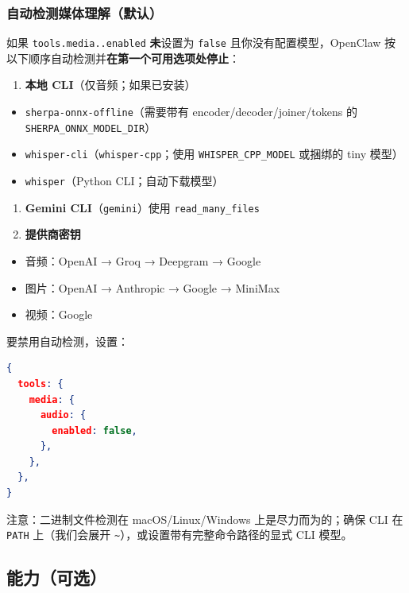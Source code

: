 \subsubsection{自动检测媒体理解（默认）}


如果 \texttt{tools.media..enabled} \textbf{未}设置为 \texttt{false} 且你没有配置模型，OpenClaw 按以下顺序自动检测并\textbf{在第一个可用选项处停止}：

\begin{enumerate}
  \item \textbf{本地 CLI}（仅音频；如果已安装）
\end{enumerate}

\begin{itemize}
  \item \texttt{sherpa-onnx-offline}（需要带有 encoder/decoder/joiner/tokens 的 \texttt{SHERPA\_ONNX\_MODEL\_DIR}）
  \item \texttt{whisper-cli}（\texttt{whisper-cpp}；使用 \texttt{WHISPER\_CPP\_MODEL} 或捆绑的 tiny 模型）
  \item \texttt{whisper}（Python CLI；自动下载模型）
\end{itemize}

\begin{enumerate}
  \item \textbf{Gemini CLI}（\texttt{gemini}）使用 \texttt{read\_many\_files}
  \item \textbf{提供商密钥}
\end{enumerate}

\begin{itemize}
  \item 音频：OpenAI → Groq → Deepgram → Google
  \item 图片：OpenAI → Anthropic → Google → MiniMax
  \item 视频：Google
\end{itemize}


要禁用自动检测，设置：

\begin{lstlisting}[language=json]
{
  tools: {
    media: {
      audio: {
        enabled: false,
      },
    },
  },
}
\end{lstlisting}


注意：二进制文件检测在 macOS/Linux/Windows 上是尽力而为的；确保 CLI 在 \texttt{PATH} 上（我们会展开 \texttt{\textasciitilde{}}），或设置带有完整命令路径的显式 CLI 模型。

\subsection{能力（可选）}


